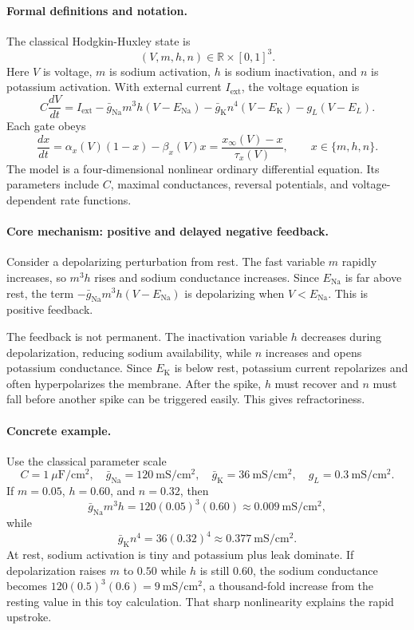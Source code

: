 \paragraph{Formal definitions and notation.}
The classical Hodgkin-Huxley state is
\[
(V,m,h,n)\in\mathbb{R}\times[0,1]^3.
\]
Here \(V\) is voltage, \(m\) is sodium activation, \(h\) is sodium inactivation, and \(n\) is potassium activation. With external current \(I_{\mathrm{ext}}\), the voltage equation is
\[
C\frac{dV}{dt}
=I_{\mathrm{ext}}
-\bar g_{\mathrm{Na}}m^3h(V-E_{\mathrm{Na}})
-\bar g_{\mathrm{K}}n^4(V-E_{\mathrm{K}})
-g_L(V-E_L).
\]
Each gate obeys
\[
\frac{dx}{dt}=\alpha_x(V)(1-x)-\beta_x(V)x
=\frac{x_\infty(V)-x}{\tau_x(V)},
\qquad x\in\{m,h,n\}.
\]
The model is a four-dimensional nonlinear ordinary differential equation. Its parameters include \(C\), maximal conductances, reversal potentials, and voltage-dependent rate functions.

\paragraph{Core mechanism: positive and delayed negative feedback.}
Consider a depolarizing perturbation from rest. The fast variable \(m\) rapidly increases, so \(m^3h\) rises and sodium conductance increases. Since \(E_{\mathrm{Na}}\) is far above rest, the term \(-\bar g_{\mathrm{Na}}m^3h(V-E_{\mathrm{Na}})\) is depolarizing when \(V<E_{\mathrm{Na}}\). This is positive feedback.

The feedback is not permanent. The inactivation variable \(h\) decreases during depolarization, reducing sodium availability, while \(n\) increases and opens potassium conductance. Since \(E_{\mathrm{K}}\) is below rest, potassium current repolarizes and often hyperpolarizes the membrane. After the spike, \(h\) must recover and \(n\) must fall before another spike can be triggered easily. This gives refractoriness.

\paragraph{Concrete example.}
Use the classical parameter scale
\[
C=1\ \mu\mathrm{F}/\mathrm{cm}^2,\quad
\bar g_{\mathrm{Na}}=120\ \mathrm{mS}/\mathrm{cm}^2,\quad
\bar g_{\mathrm{K}}=36\ \mathrm{mS}/\mathrm{cm}^2,\quad
g_L=0.3\ \mathrm{mS}/\mathrm{cm}^2.
\]
If \(m=0.05\), \(h=0.60\), and \(n=0.32\), then
\[
\bar g_{\mathrm{Na}}m^3h
=120(0.05)^3(0.60)\approx0.009\ \mathrm{mS}/\mathrm{cm}^2,
\]
while
\[
\bar g_{\mathrm{K}}n^4
=36(0.32)^4\approx0.377\ \mathrm{mS}/\mathrm{cm}^2.
\]
At rest, sodium activation is tiny and potassium plus leak dominate. If depolarization raises \(m\) to \(0.50\) while \(h\) is still \(0.60\), the sodium conductance becomes \(120(0.5)^3(0.6)=9\ \mathrm{mS}/\mathrm{cm}^2\), a thousand-fold increase from the resting value in this toy calculation. That sharp nonlinearity explains the rapid upstroke.


